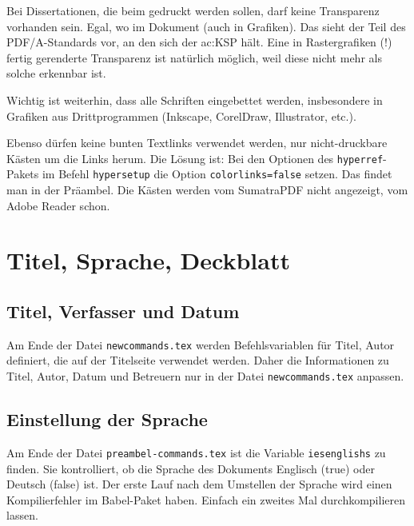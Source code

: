 Bei Dissertationen, die beim  gedruckt werden sollen, darf keine Transparenz vorhanden sein. Egal, wo im Dokument (auch in Grafiken).
Das sieht der Teil des PDF/A-Standards vor, an den sich der \gls{ac:KSP} hält. Eine in Rastergrafiken (!) fertig gerenderte Transparenz ist natürlich möglich, weil diese nicht mehr als solche erkennbar ist.

Wichtig ist weiterhin, dass alle Schriften eingebettet werden, insbesondere in Grafiken aus Drittprogrammen (Inkscape, CorelDraw, Illustrator, etc.).

Ebenso dürfen keine bunten Textlinks verwendet werden, nur nicht-druckbare Kästen um die Links herum. Die	Lösung ist: Bei den Optionen des \texttt{hyperref}-Pakets im Befehl \texttt{hypersetup} die Option \texttt{colorlinks=false} setzen. Das findet man in der Präambel. Die Kästen werden vom SumatraPDF nicht angezeigt, vom Adobe Reader schon.

\section{Titel, Sprache, Deckblatt}
\subsection{Titel, Verfasser und Datum}
Am Ende der Datei \texttt{newcommands.tex} werden Befehlsvariablen für Titel, Autor \usw definiert, die auf der Titelseite verwendet werden. Daher die Informationen zu Titel, Autor, Datum und Betreuern nur in der Datei \texttt{newcommands.tex} anpassen.

\subsection{Einstellung der Sprache}
Am Ende der Datei \texttt{preambel-commands.tex} ist die Variable \texttt{iesenglishs} zu finden. Sie kontrolliert, ob die Sprache des Dokuments Englisch (true) oder Deutsch (false) ist.
Der erste Lauf nach dem Umstellen der Sprache wird einen Kompilierfehler im Babel-Paket haben. Einfach ein zweites Mal durchkompilieren lassen.

